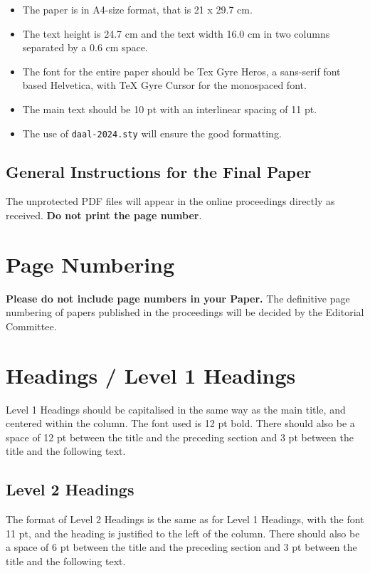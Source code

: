 \documentclass[10pt, a4paper]{article}
\begin{document}
\begin{itemize}
\item The paper is in A4-size format, that is 21 x 29.7 cm.
\item The text height is 24.7 cm and the text width 16.0 cm in two
  columns separated by a 0.6 cm space.
\item The font for the entire paper should be Tex Gyre Heros, a
  sans-serif font based Helvetica, with TeX Gyre Cursor for the
  monospaced font.
\item The main text should be 10 pt with an interlinear spacing of 11
  pt.
\item The use of \texttt{daal-2024.sty} will ensure the good formatting.
\end{itemize}



\subsection{General Instructions for the Final Paper}

The unprotected PDF files will appear in the online proceedings directly as received. \textbf{Do not print the page number}.

\section{Page Numbering}

\textbf{Please do not include page numbers in your Paper.} The definitive page numbering of papers published in the proceedings will be decided by the Editorial Committee.

\section{Headings / Level 1 Headings} 

Level 1 Headings should be capitalised in the same way as the main title, and centered within the column. The font used is 12 pt bold. There should also be a space of 12 pt between the title and the preceding section and 3 pt between the title and the following text.

\subsection{Level 2 Headings}

The format of Level 2 Headings is the same as for Level 1 Headings, with the font  11 pt, and the heading is justified to the left of the column. There should also be a space of 6 pt between the title and the preceding section and 3 pt between the title and the following text.
\end{document}
